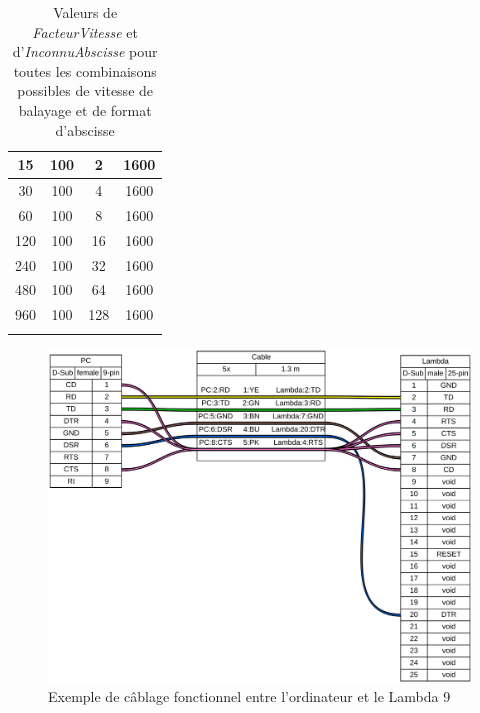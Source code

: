 \documentclass[a4paper, 12pt]{article}
\begin{document}
\begin{longtable}[c]{|c|c|c|c|}
15         & 100             & 2              & 1600    \\ \hline
30         & 100             & 4              & 1600    \\ \hline
60         & 100             & 8              & 1600    \\ \hline
120        & 100             & 16             & 1600    \\ \hline
240        & 100             & 32             & 1600    \\ \hline
480        & 100             & 64             & 1600    \\ \hline
960        & 100             & 128            & 1600    \\ \hline

\caption{Valeurs de \emph{FacteurVitesse} et d'\emph{InconnuAbscisse} pour toutes les combinaisons possibles de vitesse de balayage et de format d'abscisse}

\label{tab:ValeursFacteurVitesse}\\
\end{longtable}

\begin{figure}[htb]
		\centering
		\includegraphics[width=1\textwidth]{cableLambda.png}
		\caption{Exemple de câblage fonctionnel entre l'ordinateur et le Lambda 9} %
		\label{fig:cableLambda}
	\end{figure}
\end{document}

